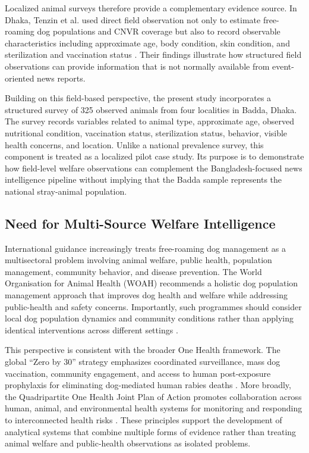 \documentclass[conference]{IEEEtran}
\begin{document}
Localized animal surveys therefore provide a complementary evidence source.
In Dhaka, Tenzin et al. used direct field observation not only to estimate
free-roaming dog populations and CNVR coverage but also to record observable
characteristics including approximate age, body condition, skin condition,
and sterilization and vaccination status \cite{tenzin2015}. Their findings
illustrate how structured field observations can provide information that is
not normally available from event-oriented news reports.

Building on this field-based perspective, the present study incorporates a
structured survey of 325 observed animals from four localities in Badda,
Dhaka. The survey records variables related to animal type, approximate age,
observed nutritional condition, vaccination status, sterilization status,
behavior, visible health concerns, and location. Unlike a national prevalence
survey, this component is treated as a localized pilot case study. Its purpose
is to demonstrate how field-level welfare observations can complement the
Bangladesh-focused news intelligence pipeline without implying that the Badda
sample represents the national stray-animal population.

\subsection{Need for Multi-Source Welfare Intelligence}

International guidance increasingly treats free-roaming dog management as a
multisectoral problem involving animal welfare, public health, population
management, community behavior, and disease prevention. The World Organisation
for Animal Health (WOAH) recommends a holistic dog population management
approach that improves dog health and welfare while addressing public-health
and safety concerns. Importantly, such programmes should consider local dog
population dynamics and community conditions rather than applying identical
interventions across different settings \cite{woah_dpm2024}.

This perspective is consistent with the broader One Health framework. The
global ``Zero by 30'' strategy emphasizes coordinated surveillance, mass dog
vaccination, community engagement, and access to human post-exposure
prophylaxis for eliminating dog-mediated human rabies deaths
\cite{who_zero2030}. More broadly, the Quadripartite One Health Joint Plan of
Action promotes collaboration across human, animal, and environmental health
systems for monitoring and responding to interconnected health risks
\cite{onehealth2022}. These principles support the development of analytical
systems that combine multiple forms of evidence rather than treating animal
welfare and public-health observations as isolated problems.
\end{document}
